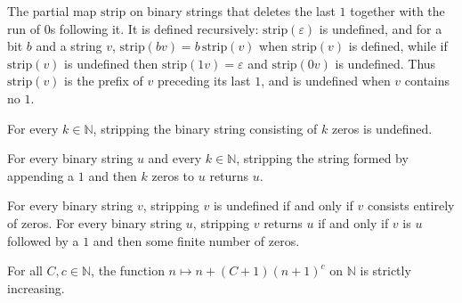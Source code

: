 \begin{definition}
\label{Complexity.stripCertificate}
\leanok
The partial map $\mathrm{strip}$ on binary strings that deletes the last $1$
together with the run of $0$s following it. It is defined recursively:
$\mathrm{strip}(\varepsilon)$ is undefined, and for a bit $b$ and a string $v$,
$\mathrm{strip}(bv) = b\,\mathrm{strip}(v)$ when $\mathrm{strip}(v)$ is defined,
while if $\mathrm{strip}(v)$ is undefined then $\mathrm{strip}(1v) = \varepsilon$
and $\mathrm{strip}(0v)$ is undefined. Thus $\mathrm{strip}(v)$ is the prefix of
$v$ preceding its last $1$, and is undefined when $v$ contains no $1$.
\end{definition}

\begin{lemma}
\label{Complexity.stripCertificate_false}
\leanok
{}
For every $k\in\mathbb{N}$, stripping the binary string consisting of $k$ zeros is
undefined.
\end{lemma}

\begin{lemma}
\label{Complexity.stripCertificate_pad}
\leanok
{}
For every binary string $u$ and every $k\in\mathbb{N}$, stripping the string formed by
appending a $1$ and then $k$ zeros to $u$ returns $u$.
\end{lemma}

\begin{lemma}
\label{Complexity.stripCertificate_spec}
\leanok
{}
For every binary string $v$, stripping $v$ is undefined if and only if $v$ consists
entirely of zeros. For every binary string $u$, stripping $v$ returns $u$ if and only if
$v$ is $u$ followed by a $1$ and then some finite number of zeros.
\end{lemma}

\begin{lemma}
\label{Complexity.certificateTotal_strictMono}
\leanok
{}
For all $C,c\in\mathbb{N}$, the function $n\mapsto n+(C+1)(n+1)^c$ on $\mathbb{N}$ is
strictly increasing.
\end{lemma}

